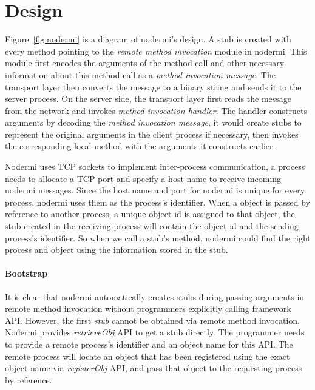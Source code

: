 \section{Design}

\nodermifig{}

Figure~\ref{fig:nodermi} is a diagram of nodermi's design.
A stub is created with every method pointing to the 
\emph{remote method invocation} module in nodermi.
This module
first encodes the arguments of the method call
 and other necessary information about this method call
as a \emph{method invocation message}.
The transport layer then converts the message to
a binary string and sends it
to the server process.
On the server side, the transport layer first reads 
the message from the network and invokes \emph{method invocation handler}.
The handler
constructs arguments by decoding the \emph{method invocation message}, 
it would create stubs to represent the original arguments in the client process
 if necessary,
then invokes the corresponding local method with the arguments
it constructs earlier.

Nodermi uses TCP sockets to implement inter-process communication,
a process needs to allocate a TCP port and specify a host name 
to receive incoming nodermi messages.
Since the host name and port for nodermi is unique for every process,
nodermi uses them as the process's identifier.
When a object is passed by reference to another process,
a unique object id is assigned to that object,
the stub created in the receiving process
will contain the object id and the sending process's identifier.
So when we call a stub's method,
nodermi could find the right process and object using
the information stored in the stub.

\paragraph{Bootstrap}
It is clear that nodermi automatically creates stubs during
passing arguments in remote method invocation without programmers
explicitly calling framework API.
However, the first \emph{stub} cannot be obtained
via remote method invocation.
Nodermi provides \emph{retrieveObj} API to get
a stub directly.
The programmer needs to provide a remote process's identifier
and an object name for this API.
The remote process will locate an object that has been registered
using the exact object name via \emph{registerObj} API,
and pass that object to the requesting process by reference.


